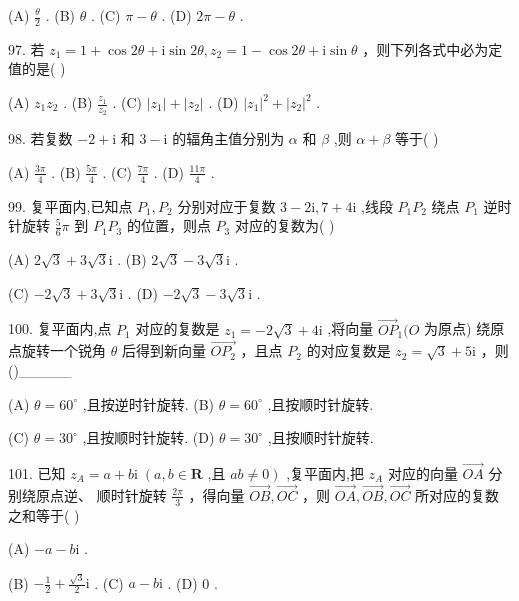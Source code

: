 \documentclass[10pt]{article}
\begin{document}
(A) \(\frac{\theta }{2}\) . (B) \(\theta\) . (C) \(\pi  - \theta\) . (D) \({2\pi } - \theta\) .

97. 若 \({z}_{1} = 1 + \cos {2\theta } + \mathrm{i}\sin {2\theta },{z}_{2} = 1 - \cos {2\theta } + \mathrm{i}\sin \theta\) ，则下列各式中必为定值的是( )

(A) \({z}_{1}{z}_{2}\) . (B) \(\frac{{z}_{1}}{{z}_{2}}\) . (C) \(\left| {z}_{1}\right|  + \left| {z}_{2}\right|\) . (D) \({\left| {z}_{1}\right| }^{2} + {\left| {z}_{2}\right| }^{2}\) .

98. 若复数 \(- 2 + \mathrm{i}\) 和 \(3 - \mathrm{i}\) 的辐角主值分别为 \(\alpha\) 和 \(\beta\) ,则 \(\alpha  + \beta\) 等于( )

(A) \(\frac{3\pi }{4}\) . (B) \(\frac{5\pi }{4}\) . (C) \(\frac{7\pi }{4}\) . (D) \(\frac{11\pi }{4}\) .

99. 复平面内,已知点 \({P}_{1},{P}_{2}\) 分别对应于复数 \(3 - 2\mathrm{i},7 + 4\mathrm{i}\) ,线段 \({P}_{1}{P}_{2}\) 绕点 \({P}_{1}\) 逆时针旋转 \(\frac{5}{6}\pi\) 到 \({P}_{1}{P}_{3}\) 的位置，则点 \({P}_{3}\) 对应的复数为( )

(A) \(2\sqrt{3} + 3\sqrt{3}\mathrm{i}\) . (B) \(2\sqrt{3} - 3\sqrt{3}\mathrm{i}\) .

(C) \(- 2\sqrt{3} + 3\sqrt{3}\mathrm{i}\) . (D) \(- 2\sqrt{3} - 3\sqrt{3}\mathrm{i}\) .

100. 复平面内,点 \({P}_{1}\) 对应的复数是 \({z}_{1} =  - 2\sqrt{3} + 4\mathrm{i}\) ,将向量 \({\overrightarrow{OP}}_{1}(O\) 为原点) 绕原点旋转一个锐角 \(\theta\) 后得到新向量 \(\overrightarrow{O{P}_{2}}\) ，且点 \({P}_{2}\) 的对应复数是 \({z}_{2} = \sqrt{3} + 5\mathrm{i}\) ，则()\_\_\_\_\_

(A) \(\theta  = {60}^{ \circ  }\) ,且按逆时针旋转. (B) \(\theta  = {60}^{ \circ  }\) ,且按顺时针旋转.

(C) \(\theta  = {30}^{ \circ  }\) ,且按顺时针旋转. (D) \(\theta  = {30}^{ \circ  }\) ,且按顺时针旋转.

101. 已知 \({z}_{A} = a + b\mathrm{i}\;\left( {a,b \in  \mathbf{R}\text{ ,且 }{ab} \neq  0}\right)\) ,复平面内,把 \({z}_{A}\) 对应的向量 \(\overrightarrow{OA}\) 分别绕原点逆、 顺时针旋转 \(\frac{2\pi }{3}\) ，得向量 \(\overrightarrow{OB},\overrightarrow{OC}\) ，则 \(\overrightarrow{OA},\overrightarrow{OB},\overrightarrow{OC}\) 所对应的复数之和等于( )

(A) \(- a - b\mathrm{i}\) .

(B) \(- \frac{1}{2} + \frac{\sqrt{3}}{2}\mathrm{i}\) . (C) \(a - b\mathrm{i}\) . (D) 0 .
\end{document}
